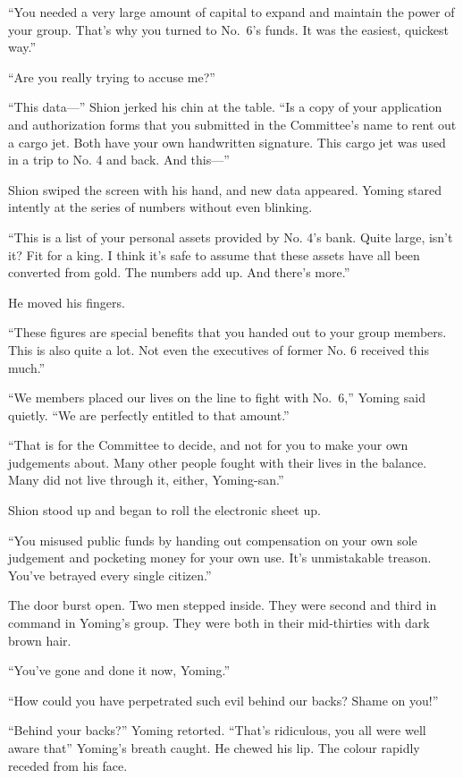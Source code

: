 ``You needed a very large amount of capital to expand and maintain the
power of your group. That's why you turned to No.~6's funds. It was the
easiest, quickest way.''

``Are you really trying to accuse me?''

``This data---'' Shion jerked his chin at the table. ``Is a copy of your
application and authorization forms that you submitted in the
Committee's name to rent out a cargo jet. Both have your own handwritten
signature. This cargo jet was used in a trip to No. 4 and back. And
this---''

Shion swiped the screen with his hand, and new data appeared. Yoming
stared intently at the series of numbers without even blinking.

``This is a list of your personal assets provided by No. 4's bank. Quite
large, isn't it? Fit for a king. I think it's safe to assume that these
assets have all been converted from gold. The numbers add up. And
there's more.''

He moved his fingers.

``These figures are special benefits that you handed out to your group
members. This is also quite a lot. Not even the executives of former No.
6 received this much.''

``\el We members placed our lives on the line to fight with No.~6,''
Yoming said quietly. ``We are perfectly entitled to that amount.''

``That is for the Committee to decide, and not for you to make your own
judgements about. Many other people fought with their lives in the
balance. Many did not live through it, either, Yoming-san.''

Shion stood up and began to roll the electronic sheet up.

``You misused public funds by handing out compensation on your own sole
judgement and pocketing money for your own use. It's unmistakable
treason. You've betrayed every single citizen.''

The door burst open. Two men stepped inside. They were second and third
in command in Yoming's group. They were both in their mid-thirties with
dark brown hair.

``You've gone and done it now, Yoming.''

``How could you have perpetrated such evil behind our backs? Shame on
you!''

``Behind your backs?'' Yoming retorted. ``That's ridiculous, you all
were well aware that\el '' Yoming's breath caught. He chewed his lip. The
colour rapidly receded from his face.

